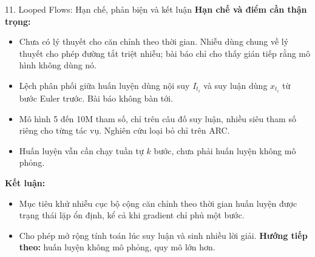 \begin{frame}{11. Looped Flows: Hạn chế, phản biện và kết luận}
    \small
    \textbf{Hạn chế và điểm cần thận trọng:}
    \begin{itemize}
        \item Chưa có lý thuyết cho căn chỉnh theo thời gian. Nhiễu dùng chung về lý thuyết cho phép đường tắt triệt nhiễu; bài báo chỉ cho thấy gián tiếp rằng mô hình không dùng nó.
        \item Lệch phân phối giữa huấn luyện dùng nội suy $I_{t_i}$ và suy luận dùng $x_{t_i}$ từ bước Euler trước. Bài báo không bàn tới.
        \item Mô hình 5 đến 10M tham số, chỉ trên câu đố suy luận, nhiều siêu tham số riêng cho từng tác vụ. Nghiên cứu loại bỏ chỉ trên ARC.
        \item Huấn luyện vẫn cần chạy tuần tự $k$ bước, chưa phải huấn luyện không mô phỏng.
    \end{itemize}
    \textbf{Kết luận:}
    \begin{itemize}
        \item Mục tiêu khử nhiễu cục bộ cộng căn chỉnh theo thời gian huấn luyện được trạng thái lặp ổn định, kể cả khi gradient chỉ phủ một bước.
        \item Cho phép mở rộng tính toán lúc suy luận và sinh nhiều lời giải. \textbf{Hướng tiếp theo:} huấn luyện không mô phỏng, quy mô lớn hơn.
    \end{itemize}
\end{frame}
